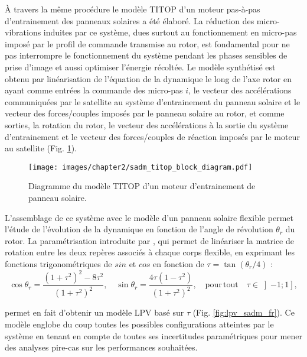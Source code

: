 À travers la même procédure le modèle TITOP d’un moteur pas-à-pas d’entrainement des panneaux solaires a été élaboré. La réduction des micro-vibrations induites par ce système, dues surtout au fonctionnement en micro-pas imposé par le profil de commande transmise au rotor, est fondamental pour ne pas interrompre le fonctionnement du système pendant les phases sensibles de prise d’image et aussi optimiser l’énergie récoltée. 
Le modèle synthétisé est obtenu par linéarisation de l’équation de la dynamique le long de l’axe rotor en ayant comme entrées la commande des micro-pas $i$, le vecteur des accélérations communiquées par le satellite au système d’entrainement du panneau solaire et le vecteur des forces/couples imposés par le panneau solaire au rotor, et comme sorties, la rotation du rotor, le vecteur des accélérations à la sortie du système d’entrainement et le vecteur des forces/couples de réaction imposés par le moteur au satellite (Fig. \ref{fig:sadm_titop_block_diagram_fr}). 

\begin{figure}[!ht]
\centering
\texttt{[image: images/chapter2/sadm\_titop\_block\_diagram.pdf]} %
\caption{Diagramme du modèle TITOP d'un moteur d'entrainement de panneau solaire.} 
\label{fig:sadm_titop_block_diagram_fr}
\end{figure}

L’assemblage de ce système avec le modèle d’un panneau solaire flexible permet l’étude de l’évolution de la dynamique en fonction de l’angle de révolution $\theta_r$ du rotor. La paramétrisation introduite par \cite{guy2014dynamic}, qui permet de linéariser la matrice de rotation entre les deux repères associés à chaque corps flexible, en exprimant les fonctions trigonométriques de $sin$ et $cos$ en fonction de $\tau = \tan(\theta_r/4)$ :
\begin{equation}
\cos\theta_r = \frac{\left( 1+\tau^2\right)^2-8\tau^2}{\left( 1+\tau^2\right)^2}, \quad \sin\theta_r = \frac{4\tau\left( 1-\tau^2\right)}{\left( 1+\tau^2\right)^2}, \quad \mathrm{pour\,tout}\quad\tau\in\left]-1;1\right],
\label{eq:parametrization_fr}
\end{equation}

permet en fait d’obtenir un modèle LPV basé sur $\tau$ (Fig. \ref{fig:lpv_sadm_fr}). Ce modèle englobe du coup toutes les possibles configurations atteintes par le système en tenant en compte de toutes ses incertitudes paramétriques pour mener des analyses pire-cas sur les performances souhaitées.

